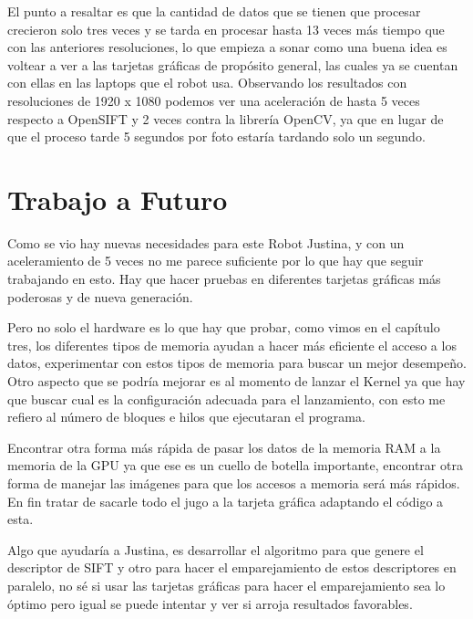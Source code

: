  
 El punto a resaltar es que la cantidad de datos que se tienen que procesar crecieron solo tres veces y se tarda en procesar hasta 13 veces más tiempo que con las anteriores resoluciones, lo que empieza a sonar como una buena idea es voltear a ver a las tarjetas gráficas de propósito general, las cuales ya se cuentan con ellas en las laptops que el robot usa. Observando los resultados con resoluciones de 1920 x 1080 podemos ver una aceleración de hasta 5 veces respecto a OpenSIFT y 2 veces contra la librería OpenCV, ya que en lugar de que el proceso tarde 5 segundos por foto estaría tardando solo un segundo.  
 

\section{Trabajo a Futuro}

 Como se vio hay nuevas necesidades para este Robot Justina, y con un aceleramiento de 5 veces no me parece suficiente  por lo que hay que seguir trabajando en esto. Hay que hacer pruebas en diferentes tarjetas gráficas más poderosas y de nueva generación.

 Pero no solo el hardware es lo que hay que probar, como vimos en el capítulo tres, los diferentes tipos de memoria ayudan a hacer más eficiente el acceso a los datos, experimentar con estos tipos de memoria para buscar un mejor desempeño. Otro aspecto que se podría mejorar es al momento de lanzar el Kernel ya que hay que buscar cual es la configuración adecuada para el lanzamiento, con esto me refiero al número de bloques e hilos que ejecutaran el programa. 

 Encontrar otra forma más rápida de pasar los datos de la memoria RAM a la memoria de la GPU ya que ese es un cuello de botella importante, encontrar otra forma de manejar las imágenes para que los accesos a memoria será más rápidos. En fin tratar de sacarle todo el jugo a la tarjeta gráfica adaptando el código a esta.  

 Algo que ayudaría a Justina, es desarrollar el algoritmo para que genere el descriptor de SIFT y otro para hacer el emparejamiento de estos descriptores en paralelo, no sé si usar las tarjetas gráficas para hacer el emparejamiento sea lo óptimo pero igual se puede intentar y ver si arroja resultados favorables.  
 
 
